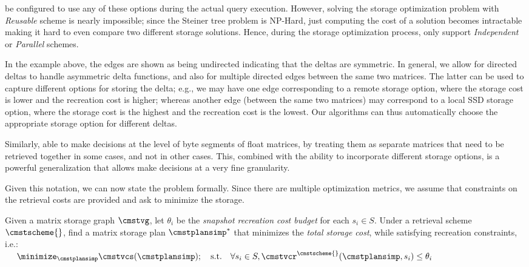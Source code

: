 \documentclass[conference]{IEEEtran}
\begin{document}
\weightstore\can be configured to use any of these options during the actual query execution. 
However, solving the storage optimization problem with {\em Reusable} scheme is nearly impossible; since the Steiner tree problem is NP-Hard, just computing the cost of a solution becomes intractable making it hard to even compare two different storage solutions. Hence, during the storage optimization process, \weightstore\can only support {\em Independent} or {\em Parallel} schemes. 


In the example above, the edges are shown as being undirected indicating that the deltas are symmetric. In general, we allow for directed deltas to handle asymmetric delta functions, and also for multiple directed edges between the same two matrices. The latter can be used to capture different options for storing the delta; e.g., we may have one edge corresponding to a remote storage option, where the storage cost is lower and the recreation cost is higher; whereas another edge (between the same two matrices) may correspond to a local SSD storage option, where the storage cost is the highest and the recreation cost is the lowest. Our algorithms can thus automatically choose the appropriate storage option for different deltas.


Similarly, \weightstore\is able to make decisions at the level of byte segments of float matrices, by treating them as separate matrices that need to be retrieved together in some cases, and not in other cases. This, combined with the ability to incorporate different storage options, is a powerful generalization that allows \weightstore\to make decisions at a very fine granularity. 



Given this notation, we can now state the problem formally. Since there are multiple optimization metrics, we assume that constraints on the retrieval costs are provided and ask to minimize the storage.


\begin{problem}
\label{prob:pas_storage}
Given %
a matrix storage graph $\cmstvg$, let $\theta_i$ be the {\em snapshot recreation cost budget} for each $s_i \in S$. Under a retrieval scheme $\cmstscheme{}$, find a matrix storage plan $\cmstplansimp^*$ that minimizes the \emph{total storage cost}, while satisfying recreation constraints, i.e.:\\
{{\mbox{\ } \ $\minimize_{\cmstplansimp} \cmstvcs(\cmstplansimp); \quad \text{s.t.}\quad \forall s_i \in S, \cmstvcr^{\cmstscheme{}}(\cmstplansimp, s_i) \leq \theta_i$}}
\end{problem}
\end{document}
